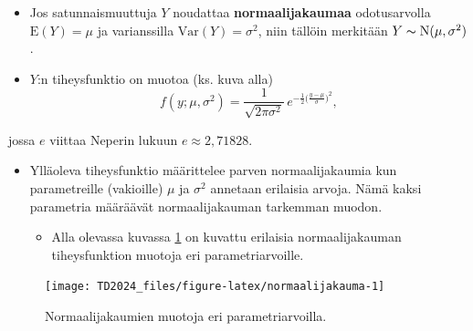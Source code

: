 \documentclass[
]{book}
\providecommand{\tightlist}{%
  \setlength{\itemsep}{0pt}\setlength{\parskip}{0pt}}
\begin{document}
\begin{itemize}
\item
  Jos satunnaismuuttuja \(Y\) noudattaa \textbf{normaalijakaumaa} odotusarvolla \(\text{E}(Y)= \mu\) ja varianssilla \(\mathrm{Var}(Y) = \sigma^2\), niin tällöin merkitään \(Y \thicksim \text{N}(\mu, \sigma^2)\).
\item
  \(Y\):n tiheysfunktio on muotoa (ks. kuva alla)
  \[
  f(y; \mu, \sigma^2) = \frac{1}{\sqrt{2 \pi \sigma^2}} \, e^{-\frac{1}{2} \Big(\frac{y- \mu}{\sigma} \Big)^2}, 
  \]
\end{itemize}

jossa \(e\) viittaa Neperin lukuun \(e \approx 2,71828\).

\begin{itemize}
\tightlist
\item
  Ylläoleva tiheysfunktio määrittelee parven normaalijakaumia kun parametreille (vakioille) \(\mu\) ja \(\sigma^2\) annetaan erilaisia arvoja. Nämä kaksi parametria määräävät normaalijakauman tarkemman muodon.

  \begin{itemize}
  \tightlist
  \item
    Alla olevassa kuvassa \ref{fig:normaalijakauma} on kuvattu erilaisia normaalijakauman tiheysfunktion muotoja eri parametriarvoille.
  \end{itemize}
\end{itemize}

\begin{figure}

{\centering \texttt{[image: TD2024\_files/figure-latex/normaalijakauma-1]} 

}

\caption{Normaalijakaumien muotoja eri parametriarvoilla.}\label{fig:normaalijakauma}
\end{figure}
\end{document}
